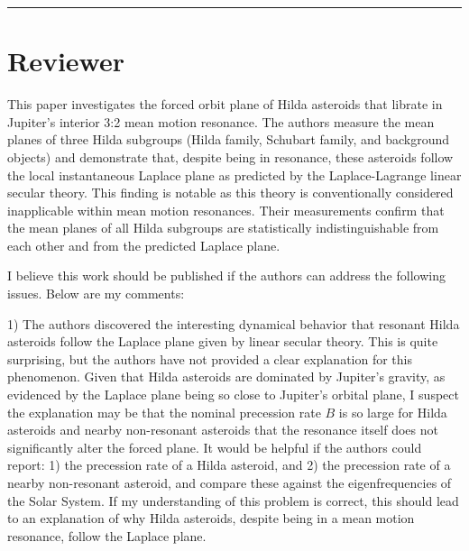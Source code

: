 \documentclass[11pt]{article}
\newcounter{reviewer}
\newcounter{point}[reviewer]
\newcommand{\reviewersection}{\stepcounter{reviewer} \bigskip \hrule
                  \section*{Reviewer \thereviewer}}
\begin{document}
\reviewersection

This paper investigates the forced orbit plane of Hilda asteroids that librate in Jupiter's interior 3:2 mean motion resonance. The authors measure the mean planes of three Hilda subgroups (Hilda family, Schubart family, and background objects) and demonstrate that, despite being in resonance, these asteroids follow the local instantaneous Laplace plane as predicted by the Laplace-Lagrange linear secular theory. This finding is notable as this theory is conventionally considered inapplicable within mean motion resonances. Their measurements confirm that the mean planes of all Hilda subgroups are statistically indistinguishable from each other and from the predicted Laplace plane.

I believe this work should be published if the authors can address the following issues. Below are my comments:

1) The authors discovered the interesting dynamical behavior that resonant Hilda asteroids follow the Laplace plane given by linear secular theory. This is quite surprising, but the authors have not provided a clear explanation for this phenomenon. Given that Hilda asteroids are dominated by Jupiter's gravity, as evidenced by the Laplace plane being so close to Jupiter's orbital plane, I suspect the explanation may be that the nominal precession rate $B$ is so large for Hilda asteroids and nearby non-resonant asteroids that the resonance itself does not significantly alter the forced plane. It would be helpful if the authors could report: 1) the precession rate of a Hilda asteroid, and 2) the precession rate of a nearby non-resonant asteroid, and compare these against the eigenfrequencies of the Solar System. If my understanding of this problem is correct, this should lead to an explanation of why Hilda asteroids, despite being in a mean motion resonance, follow the Laplace plane.
\end{document}
